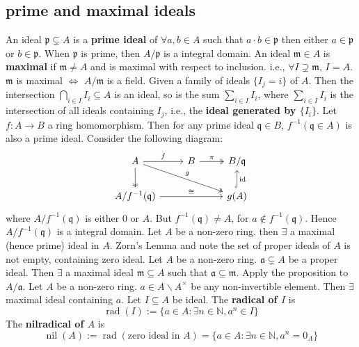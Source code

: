 \documentclass[12pt]{article}
\theoremstyle{definition}
\theoremstyle{plain}
\DeclareMathOperator{\id}{id}
\DeclareMathOperator{\nil}{nil}
\DeclareMathOperator{\rad}{rad}
\newcommand{\nat}{\mathbb{N}}
\begin{document}
\bigskip
\subsection{prime and maximal ideals}
\Def An ideal $\mathfrak{p}\subsetneq A$ is a \textbf{prime ideal} of $\forall a, b\in A$ such that $a\cdot b\in \mathfrak{p}$ then either $a\in \mathfrak{p}$ or $b\in \mathfrak{p}$.
\Rmk When $\mathfrak{p}$ is prime, then $A/\mathfrak{p}$ is a integral domain.
\Def An ideal $\mathfrak{m}\in A$ is \textbf{maximal} if $\mathfrak{m}\neq A$ and is maximal with respect to inclusion. i.e., $\forall I\supsetneq \mathfrak{m}$, $I=A$.
\Rmk $\mathfrak{m}$ is maximal $\iff$ $A/\mathfrak{m}$ is a field.
\Rmk Given a family of ideals $\{I_j=i\}$ of $A$. Then the intersection $\bigcap_{i\in I}I_i\subseteq A$ is an ideal, so is the sum $\sum_{i\in I}I_i$, where $\sum_{i\in I}I_i$ is the intersection of all ideals containing $I_j$, i.e., the \textbf{ideal generated by $\{I_i\}$}.
\Prop Let $f:A\to B$ a ring homomorphism. Then for any prime ideal $\mathfrak{q}\in B$, $f^{-1}(\mathfrak{q}\in A)$ is also a prime ideal.
\proof Consider the following diagram:
\begin{equation}
  \begin{tikzcd}
    A\ar{r}{f} \ar[two heads]{d} \ar[two heads]{rrd}{g}&B \ar[two heads]{r}{\pi} &B/\mathfrak{q}\\
    A/f^{-1}(\mathfrak{q})\ar{rr}{\cong} & &g(A)\ar[hook]{u}[swap]{\id}
  \end{tikzcd}
\end{equation}
where $A/f^{-1}(\mathfrak{q})$ is either $0$ or $A$. But $f^{-1}(\mathfrak{q})\neq A$, for $a\notin f^{-1}(\mathfrak{q})$. Hence $A/f^{-1}(\mathfrak{q})$ is a integral domain.
 Let $A$ be a non-zero ring. then $\exists$ a maximal (hence prime) ideal in $A$.
\proof Zorn's Lemma and note the set of proper ideals of $A$ is not empty, containing zero ideal.
\Cor Let $A$ be a non-zero ring. $\mathfrak{a}\subsetneq A$ be a proper ideal. Then $\exists $ a maximal ideal $\mathfrak{m}\subseteq A$ such that $\mathfrak{a}\subseteq \mathfrak{m}$.
\proof Apply the proposition to $A/\mathfrak{a}$.
\Cor Let $A$ be a non-zero ring. $a\in A\backslash A^\times$ be any non-invertible element. Then $\exists$ maximal ideal containing $a$.
\Def Let $I\subseteq A$ be ideal. The \textbf{radical of $I$} is
$$\rad(I):=\{a\in A: \exists n\in \nat, a^n\in I\}$$
The \textbf{nilradical of $A$} is
$$\nil(A):=\rad(\text{zero ideal in }A)=\{a\in A:\exists n\in \nat, a^n=0_A\}$$
\end{document}
